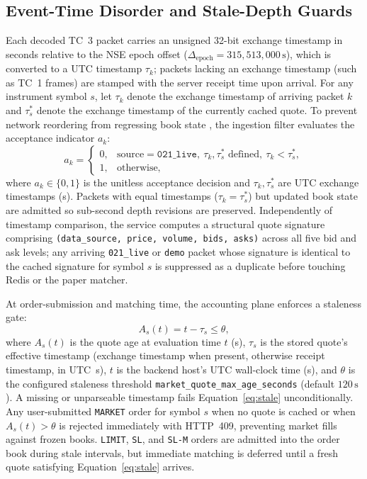 \documentclass[12pt]{article}
\newcommand{\thinunit}[2]{#1\,\text{#2}}
\begin{document}
\subsection{Event-Time Disorder and Stale-Depth Guards}
Each decoded TC~3 packet carries an unsigned 32-bit exchange timestamp in seconds relative to the NSE epoch offset ($\Delta_{\mathrm{epoch}} = 315{,}513{,}000\,\text{s}$), which is converted to a UTC timestamp $\tau_k$; packets lacking an exchange timestamp (such as TC~1 frames) are stamped with the server receipt time upon arrival. For any instrument symbol $s$, let $\tau_k$ denote the exchange timestamp of arriving packet $k$ and $\tau^{*}_s$ denote the exchange timestamp of the currently cached quote. To prevent network reordering from regressing book state \cite{akidau2015,lamport1978}, the ingestion filter evaluates the acceptance indicator $a_k$:
\begin{equation}
a_k =
\begin{cases}
0, & \text{source}=\texttt{021\_live},\ \tau_k,\tau^{*}_s\text{ defined},\ \tau_k < \tau^{*}_s,\\
1, & \text{otherwise,}
\end{cases}
\label{eq:order}
\end{equation}
where $a_k\in\{0,1\}$ is the unitless acceptance decision and $\tau_k, \tau^{*}_s$ are UTC exchange timestamps (s). Packets with equal timestamps ($\tau_k = \tau^{*}_s$) but updated book state are admitted so sub-second depth revisions are preserved. Independently of timestamp comparison, the service computes a structural quote signature comprising \texttt{(data\_source, price, volume, bids, asks)} across all five bid and ask levels; any arriving \texttt{021\_live} or \texttt{demo} packet whose signature is identical to the cached signature for symbol $s$ is suppressed as a duplicate before touching Redis or the paper matcher.

At order-submission and matching time, the accounting plane enforces a staleness gate:
\begin{equation}
A_s(t) = t - \tau_s \le \theta,
\label{eq:stale}
\end{equation}
where $A_s(t)$ is the quote age at evaluation time $t$ (s), $\tau_s$ is the stored quote's effective timestamp (exchange timestamp when present, otherwise receipt timestamp, in UTC~s), $t$ is the backend host's UTC wall-clock time (s), and $\theta$ is the configured staleness threshold \texttt{market\_quote\_max\_age\_seconds} (default $\thinunit{120}{s}$). A missing or unparseable timestamp fails Equation~\eqref{eq:stale} unconditionally. Any user-submitted \texttt{MARKET} order for symbol $s$ when no quote is cached or when $A_s(t) > \theta$ is rejected immediately with HTTP~409, preventing market fills against frozen books. \texttt{LIMIT}, \texttt{SL}, and \texttt{SL-M} orders are admitted into the order book during stale intervals, but immediate matching is deferred until a fresh quote satisfying Equation~\eqref{eq:stale} arrives.
\end{document}
